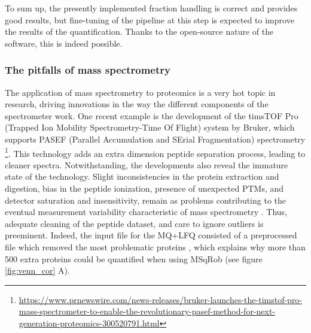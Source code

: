 To sum up, the presently implemented fraction handling is correct and provides good results, but fine-tuning of the pipeline at this step is expected to improve the results of the quantification. Thanks to the open-source nature of the software, this is indeed possible.


%
%
%
%
%


\subsubsection{The pitfalls of mass spectrometry}

The application of mass spectrometry to proteomics is a very hot topic in research, driving innovations in the way the different components of the spectrometer work. One recent example is the development of the timsTOF\texttrademark\xspace Pro (Trapped Ion Mobility Spectrometry-Time Of Flight) system by Bruker, which supports PASEF (Parallel Accumulation and SErial Fragmentation) spectrometry \footnote{\href{https://www.prnewswire.com/news-releases/bruker-launches-the-timstof-pro-mass-spectrometer-to-enable-the-revolutionary-pasef-method-for-next-generation-proteomics-300520791.html}{https://www.prnewswire.com/news-releases/bruker-launches-the-timstof-pro-mass-spectrometer-to-enable-the-revolutionary-pasef-method-for-next-generation-proteomics-300520791.html}}. This technology adds  an extra dimension peptide separation process, leading to cleaner spectra.
Notwithstanding, the developments also reveal the immature state of the technology. Slight inconsistencies in the protein extraction and digestion, bias in the peptide ionization, presence of unexpected PTMs, and detector saturation and insensitivity, remain as problems contributing to the eventual measurement variability characteristic of mass spectrometry \cite{Piehowski2013}. Thus, adequate cleaning of the peptide dataset, and care to ignore outliers is preeminent. Indeed, the input file for the MQ+LFQ consisted of a preprocessed file which removed the most problematic proteins \cite{Cox2014}, which explains why more than 500 extra proteins could be quantified when using MSqRob (see figure \ref{fig:venn_cor} A).

